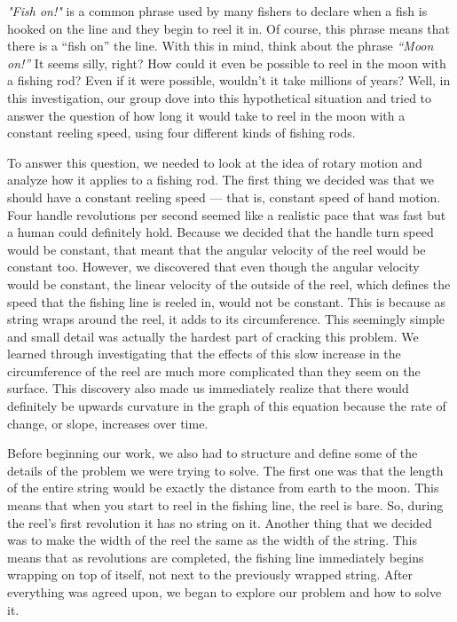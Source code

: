 
\emph{"Fish on!"} is a common phrase used by many fishers to declare when a fish is hooked on the line and they begin to reel it in. Of course, this phrase means that there is a “fish on” the line. With this in mind, think about the phrase \emph{“Moon on!”} It seems silly, right? How could it even be possible to reel in the moon with a fishing rod? Even if it were possible, wouldn’t it take millions of years? Well, in this investigation, our group dove into this hypothetical situation and tried to answer the question of how long it would take to reel in the moon with a constant reeling speed, using four different kinds of fishing rods.

To answer this question, we needed to look at the idea of rotary motion and analyze how it applies to a fishing rod. The first thing we decided was that we should have a constant reeling speed — that is, constant speed of hand motion. Four handle revolutions per second seemed like a realistic pace that was fast but a human could definitely hold. Because we decided that the handle turn speed would be constant, that meant that the angular velocity of the reel would be constant too. However, we discovered that even though the angular velocity would be constant, the linear velocity of the outside of the reel, which defines the speed that the fishing line is reeled in, would not be constant. This is because as string wraps around the reel, it adds to its circumference. This seemingly simple and small detail was actually the hardest part of cracking this problem. We learned through investigating that the effects of this slow increase in the circumference of the reel are much more complicated than they seem on the surface. This
discovery also made us immediately realize that there would definitely be upwards curvature in the graph of this equation because the rate of change, or slope, increases over time.

Before beginning our work, we also had to structure and define some of the details of the problem we were trying to solve. The first one was that the length of the entire string would be exactly the distance from earth to the moon. This means that when you start to reel in the fishing line, the reel is bare. So, during the reel’s first revolution it has no string on it. Another thing that we decided was to make the width of the reel the same as the width of the string. This means that as revolutions are completed, the fishing line immediately begins wrapping on top of itself, not next to the previously wrapped string. After everything was agreed upon, we began to explore our problem and how to solve it.


